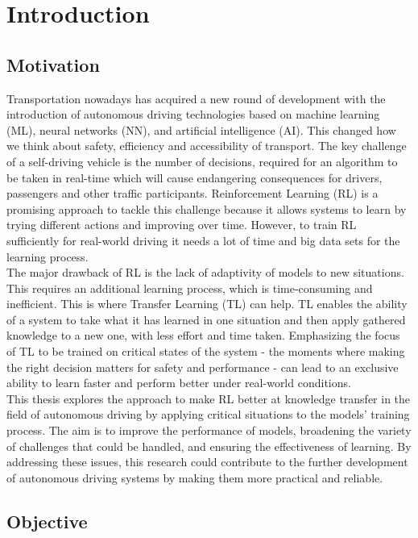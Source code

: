 \section{Introduction}\label{chap:chap_1}


\subsection{Motivation}
Transportation nowadays has acquired a new round of development with the introduction of autonomous driving technologies based on machine learning (ML), neural networks (NN), and artificial intelligence (AI). This changed how we think about safety, efficiency and accessibility of transport. The key challenge of a self-driving vehicle is the number of decisions, required for an algorithm to be taken in real-time which will cause endangering consequences for drivers, passengers and other traffic participants. Reinforcement Learning (RL) is a promising approach to tackle this challenge because it allows systems to learn by trying different actions and improving over time. However, to train RL sufficiently for real-world driving it needs a lot of time and big data sets for the learning process.\\
The major drawback of RL is the lack of adaptivity of models to new situations. This requires an additional learning process, which is time-consuming and inefficient. This is where Transfer Learning (TL) can help. TL enables the ability of a system to take what it has learned in one situation and then apply gathered knowledge to a new one, with less effort and time taken. Emphasizing the focus of TL to be trained on critical states of the system - the moments where making the right decision matters for safety and performance -  can lead to an exclusive ability to learn faster and perform better under real-world conditions.\\
This thesis explores the approach to make RL better at knowledge transfer in the field of autonomous driving by applying critical situations to the models' training process. The aim is to improve the performance of models, broadening the variety of challenges that could be handled, and ensuring the effectiveness of learning. By addressing these issues, this research could contribute to the further development of autonomous driving systems by making them more practical and reliable.\\


\subsection{Objective}




